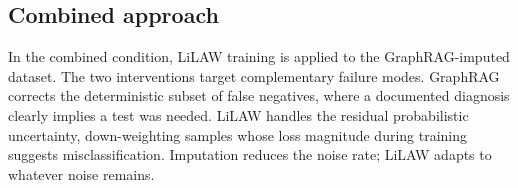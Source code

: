 \subsection{Combined approach}

In the combined condition, LiLAW training is applied to the GraphRAG-imputed dataset. The two interventions target complementary failure modes. GraphRAG corrects the deterministic subset of false negatives, where a documented diagnosis clearly implies a test was needed. LiLAW handles the residual probabilistic uncertainty, down-weighting samples whose loss magnitude during training suggests misclassification. Imputation reduces the noise rate; LiLAW adapts to whatever noise remains.
